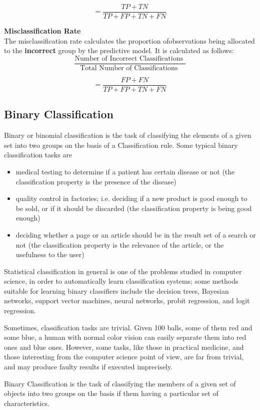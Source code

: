 \documentclass[12pt]{article}
\begin{document}
	\[ = \frac{TP + TN}{TP+FP+TN+FN}\]
	
	
	\noindent \textbf{Misclassification Rate}\\
	The misclassification rate calculates the proportion ofobservations being allocated to the \textbf{incorrect} group by the predictive model. It is calculated as follows:
	\[ \frac{
		\mbox{Number of Incorrect Classifications }}{\mbox{Total Number of Classifications }} \]
	
	\[ = \frac{FP + FN}{TP+FP+TN+FN}\]
\newpage
\subsection{Binary Classification}

Binary or binomial classification is the task of classifying the elements of a given set into two groups on the basis of a Classification rule. Some typical binary classification tasks are

\begin{itemize}
	\item medical testing to determine if a patient has certain disease or not (the classification property is the presence of the disease)
	\item quality control in factories; i.e. deciding if a new product is good enough to be sold, or if it should be discarded (the classification property is being good enough)
	\item deciding whether a page or an article should be in the result set of a search or not (the classification property is the relevance of the article, or the usefulness to the user)
\end{itemize}
Statistical classification in general is one of the problems studied in computer science, in order to automatically learn classification systems; some methods suitable for learning binary classifiers include the decision trees, Bayesian networks, support vector machines, neural networks, probit regression, and logit regression.

Sometimes, classification tasks are trivial. Given 100 balls, some of them red and some blue, a human with normal color vision can easily separate them into red ones and blue ones. However, some tasks, like those in practical medicine, and those interesting from the computer science point of view, are far from trivial, and may produce faulty results if executed imprecisely.

\newpage
Binary Classification is the task of classifying the members of a given set of objects into two groups on the basis
if them having a particular set of characteristics.
\end{document}
